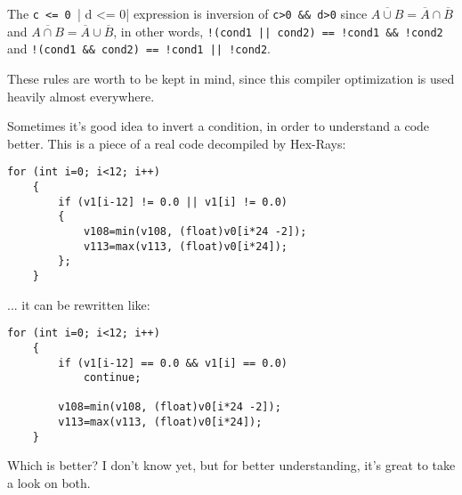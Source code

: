 The \verb|c <= 0 || d <= 0| expression is inversion of \verb|c>0 && d>0| since 
$\overline{A \cup B} = \overline{A} \cap \overline{B}$ and
$\overline{A \cap B} = \overline{A} \cup \overline{B}$,
in other words,
\verb~!(cond1 || cond2) == !cond1 && !cond2~ and \verb~!(cond1 && cond2) == !cond1 || !cond2~.

These rules are worth to be kept in mind, since this compiler optimization is used heavily almost everywhere.

Sometimes it's good idea to invert a condition, in order to understand a code better.
This is a piece of a real code decompiled by Hex-Rays:

\begin{lstlisting}[style=customc]
	for (int i=0; i<12; i++)
	{
		if (v1[i-12] != 0.0 || v1[i] != 0.0)
		{
			v108=min(v108, (float)v0[i*24 -2]);
			v113=max(v113, (float)v0[i*24]);
		};
	}
\end{lstlisting}

... it can be rewritten like:

\begin{lstlisting}[style=customc]
	for (int i=0; i<12; i++)
	{
		if (v1[i-12] == 0.0 && v1[i] == 0.0)
			continue;

		v108=min(v108, (float)v0[i*24 -2]);
		v113=max(v113, (float)v0[i*24]);
	}
\end{lstlisting}

Which is better? I don't know yet, but for better understanding, it's great to take a look on both.

